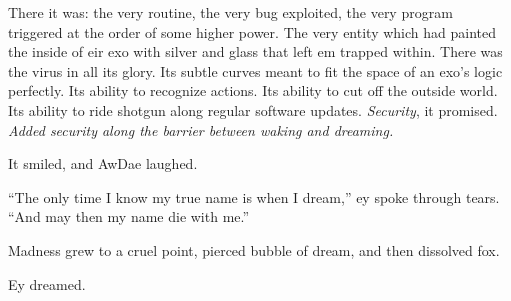 There it was: the very routine, the very bug exploited, the very program triggered at the order of some higher power. The very entity which had painted the inside of eir exo with silver and glass that left em trapped within. There was the virus in all its glory. Its subtle curves meant to fit the space of an exo's logic perfectly. Its ability to recognize actions. Its ability to cut off the outside world. Its ability to ride shotgun along regular software updates. \emph{Security}, it promised. \emph{Added security along the barrier between waking and dreaming.}

It smiled, and AwDae laughed.

``The only time I know my true name is when I dream,'' ey spoke through tears. ``And may then my name die with me.''

Madness grew to a cruel point, pierced bubble of dream, and then dissolved fox.

Ey dreamed.
